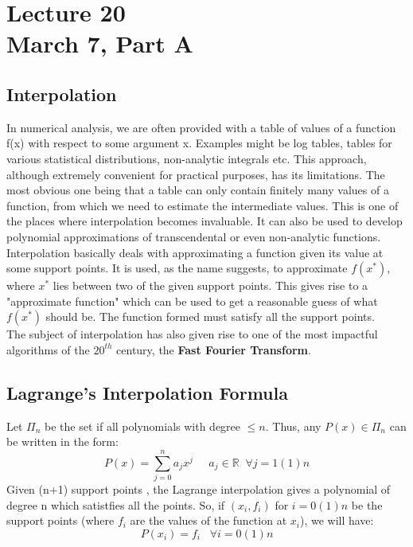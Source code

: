 \chapter*{Lecture 20\\March 7, Part A}
\setcounter{chapter}{4}


\setcounter{section}{0}

\section{Interpolation}

In numerical analysis, we are often provided with a table of values of a function f(x) with respect to some argument x. Examples might be log tables, tables for various statistical distributions, non-analytic integrals etc. This approach, although extremely convenient for practical purposes, has its limitations. The most obvious one being that a table can only contain finitely many values of a function, from which we need to estimate the intermediate values. This is one of the places where interpolation becomes invaluable. It can also be used to develop polynomial approximations of transcendental or even non-analytic functions.\\
Interpolation basically deals with approximating a function given its value at some support points. It is used, as the name suggests, to approximate $f(x^*)$, where $x^*$ lies between two of the given support points. This gives rise to a "approximate function" which can be used to get a reasonable guess of what $f(x^*)$ should be. The function formed must satisfy all the support points.\\
The subject of interpolation has also given rise to one of the most impactful algorithms of the $20^{th}$ century, the \textbf{Fast Fourier Transform}.

\section{Lagrange's Interpolation Formula}
 
Let $\Pi_n$ be the set if all polynomials with degree $\leq n$. Thus, any $P(x) \in \Pi_n$ can be written in the form:
$$P(x) = \sum_{j = 0}^n a_j x^j\;\;\;\;\;a_j \in \mathbb{R}\;\;\forall j= 1(1)n$$
Given (n+1) support points , the Lagrange interpolation gives a polynomial of degree n which satistfies all the points. So, if $(x_i,f_i)$ for $i = 0(1)n$ be the support points (where $f_i$ are the values of the function at $x_i$), we will have:
$$P(x_i) = f_i    \;\;\; \forall i = 0(1)n$$


